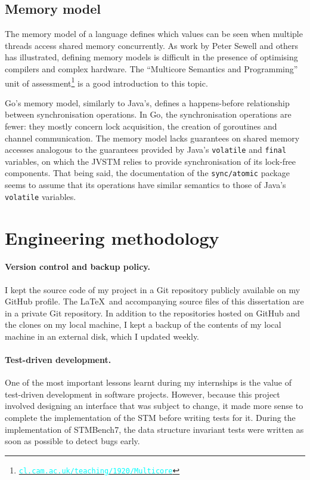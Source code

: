\documentclass[12pt,a4paper,oneside,openright]{report}
\newcommand{\URL}[1]{\href{https://#1}{\textcolor{cyan}{\texttt{#1}}}}
\newcommand{\javaCode}[1]{\texttt{#1}}
\newcommand{\goCode}[1]{\texttt{#1}}
\begin{document}
\subsection{Memory model}
\label{sec:prep:memory-model}

The memory model of a language defines which values can be seen when
multiple threads access shared memory concurrently. As work by Peter
Sewell and others has illustrated, defining memory models is difficult
in the presence of optimising compilers and complex hardware. The
``Multicore Semantics and Programming'' unit of
assessment\footnote{\URL{cl.cam.ac.uk/teaching/1920/Multicore}} is a
good introduction to this topic.

Go's memory model, similarly to Java's, defines a happens-before
relationship between synchronisation operations. In Go, the
synchronisation operations are fewer: they mostly concern lock
acquisition, the creation of goroutines and channel communication. The
memory model lacks guarantees on shared memory accesses analogous to
the guarantees provided by Java's \javaCode{volatile} and
\javaCode{final} variables, on which the JVSTM relies to provide
synchronisation of its lock-free components. That being said, the
documentation of the \goCode{sync/atomic} package seems to assume that
its operations have similar semantics to those of Java's
\javaCode{volatile} variables.

\section{Engineering methodology}
\label{sec:engin-meth}

\paragraph{Version control and backup policy.} I kept the source code
of my project in a Git repository publicly available on my GitHub
profile. The \LaTeX\ and accompanying source files of this
dissertation are in a private Git repository. In addition to the
repositories hosted on GitHub and the clones on my local machine, I
kept a backup of the contents of my local machine in an external disk,
which I updated weekly.

\paragraph{Test-driven development.} One of the most important lessons
learnt during my internships is the value of test-driven development
in software projects. However, because this project involved designing
an interface that was subject to change, it made more sense to
complete the implementation of the STM before writing tests for
it. During the implementation of STMBench7, the data structure
invariant tests were written as soon as possible to detect bugs early.
\end{document}
